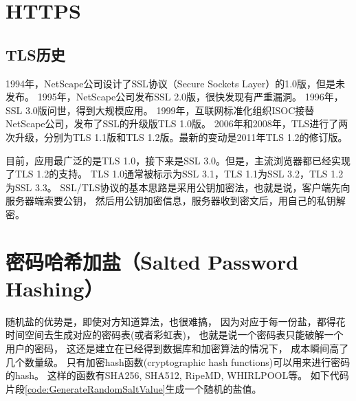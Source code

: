 \documentclass{book}
\begin{document}
\section{HTTPS}

\subsection{TLS历史}

1994年，NetScape公司设计了SSL协议（Secure Sockets Layer）的1.0版，但是未发布。
1995年，NetScape公司发布SSL 2.0版，很快发现有严重漏洞。
1996年，SSL 3.0版问世，得到大规模应用。
1999年，互联网标准化组织ISOC接替NetScape公司，发布了SSL的升级版TLS 1.0版。
2006年和2008年，TLS进行了两次升级，分别为TLS 1.1版和TLS 1.2版。最新的变动是2011年TLS 1.2的修订版。

目前，应用最广泛的是TLS 1.0，接下来是SSL 3.0。但是，主流浏览器都已经实现了TLS 1.2的支持。
TLS 1.0通常被标示为SSL 3.1，TLS 1.1为SSL 3.2，TLS 1.2为SSL 3.3。
SSL/TLS协议的基本思路是采用公钥加密法，也就是说，客户端先向服务器端索要公钥，
然后用公钥加密信息，服务器收到密文后，用自己的私钥解密。

\section{密码哈希加盐（Salted Password Hashing）}

随机盐的优势是，即使对方知道算法，也很难搞，
因为对应于每一份盐，都得花时间空间去生成对应的密码表(或者彩虹表)，
也就是说一个密码表只能破解一个用户的密码，
这还是建立在已经得到数据库和加密算法的情况下，
成本瞬间高了几个数量级。
只有加密hash函数(cryptographic hash functions)可以用来进行密码的hash。
这样的函数有SHA256, SHA512, RipeMD, WHIRLPOOL等。
如下代码片段\ref{code:GenerateRandomSaltValue}生成一个随机的盐值。
\end{document}
